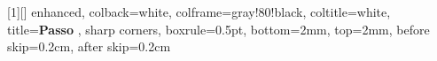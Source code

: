 %

[1][]{
    enhanced,
    colback=white,
    colframe=gray!80!black,
    coltitle=white,
    title={\textbf{Passo \thestep} },
    sharp corners,
    boxrule=0.5pt,
    bottom=2mm, top=2mm,
    before skip=0.2cm,
    after skip=0.2cm
}